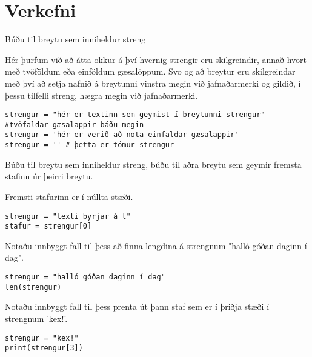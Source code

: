\section{Verkefni}
\begin{exercise}\label{str1}
	Búðu til breytu sem inniheldur streng
\end{exercise}
\begin{Answer}[ref={str1}]
	Hér þurfum við að átta okkur á því hvernig strengir eru skilgreindir, annað hvort með tvöföldum eða einföldum gæsalöppum.
	Svo og að breytur eru skilgreindar með því að setja nafnið á breytunni vinstra megin við jafnaðarmerki og gildið, í þessu tilfelli streng, hægra megin við jafnaðarmerki.
	\begin{lstlisting}
strengur = "hér er textinn sem geymist í breytunni strengur" #tvöfaldar gæsalappir báðu megin
strengur = 'hér er verið að nota einfaldar gæsalappir'
strengur = '' # þetta er tómur strengur\end{lstlisting}
\end{Answer}

\begin{exercise}\label{str2}
	Búðu til breytu sem inniheldur streng, búðu til aðra breytu sem geymir fremsta stafinn úr þeirri breytu.
\end{exercise}
\begin{Answer}[ref={str2}]
	Fremsti stafurinn er í núllta stæði.
	\begin{lstlisting}
strengur = "texti byrjar á t"
stafur = strengur[0]\end{lstlisting}
\end{Answer}

\begin{exercise}\label{str3}
	Notaðu innbyggt fall til þess að finna lengdina á strengnum "halló góðan daginn í dag".
\end{exercise}
\begin{Answer}[ref={str3}]
	\begin{lstlisting}
strengur = "halló góðan daginn í dag"
len(strengur)\end{lstlisting}
\end{Answer}

\begin{exercise}\label{str4}
	Notaðu innbyggt fall til þess prenta út þann staf sem er í þriðja stæði í strengnum 'kex!'.
\end{exercise}
\begin{Answer}[ref={str4}]
\begin{lstlisting}
strengur = "kex!"
print(strengur[3])\end{lstlisting}
\end{Answer}


